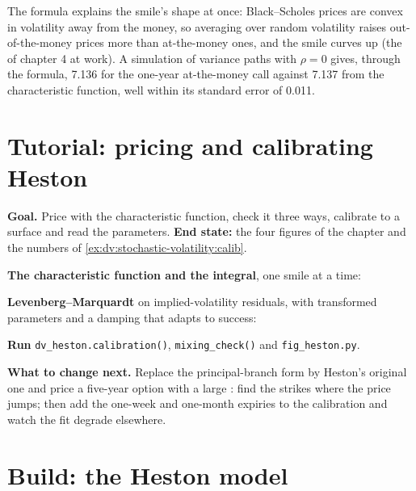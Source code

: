 The formula explains the smile's shape at once: Black--Scholes prices are convex in volatility away from
the money, so averaging over random volatility raises out-of-the-money prices more than at-the-money
ones, and the smile curves up (the  of chapter 4 at work). A simulation of variance paths with
$\rho=0$ gives, through the formula, 7.136 for the one-year at-the-money call against 7.137 from the
characteristic function, well within its standard error of 0.011.

\section{Tutorial: pricing and calibrating Heston}\label{tut:dv:stochastic-volatility:tut}

\begin{tutorial}
\textbf{Goal.} Price with the characteristic function, check it three ways, calibrate to a surface and read
the parameters. \textbf{End state:} the four figures of the chapter and the numbers of
\cref{ex:dv:stochastic-volatility:calib}.
\begin{tutsteps}
\item \textbf{The characteristic function and the integral}, one smile at a time:
\label{lst:dv:stochastic-volatility:cf}
\item \textbf{Levenberg--Marquardt} on implied-volatility residuals, with transformed parameters and a
damping that adapts to success:
\label{lst:dv:stochastic-volatility:calib}
\item \textbf{Run} \texttt{dv\_heston.calibration()}, \texttt{mixing\_check()} and \texttt{fig\_heston.py}.
\end{tutsteps}
\textbf{What to change next.} Replace the principal-branch form by Heston's original one and price a five-year
option with a large : find the strikes where the price jumps; then add the one-week and
one-month expiries to the calibration and watch the fit degrade elsewhere.
\end{tutorial}

\section{Build: the Heston model}\label{bld:dv:stochastic-volatility:heston}

